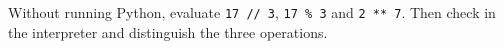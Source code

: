 Without running Python, evaluate \texttt{17 // 3}, \texttt{17 \% 3} and \texttt{2 ** 7}. Then check in the interpreter and distinguish the three operations.
